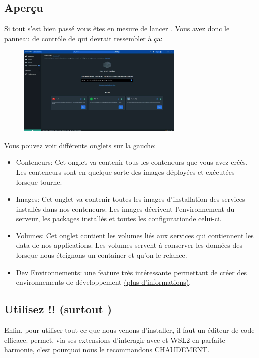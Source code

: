 \newpage

\subsection[Aperçu]{Aperçu\label{sec:suite_installation}}
    Si tout s'est bien passé vous êtes en mesure de lancer \dockerdesktop{}. Vous avez donc le panneau de contrôle de \dockerdesktop{} qui devrait ressembler à ça:\\
    \begin{figure}[h]
        \centering
        \includegraphics[width=0.7\textwidth]{Images_formation/PanelDocker.pdf}
    \end{figure}

    Vous pouvez voir différents onglets sur la gauche:

    \begin{itemize}
        \item Conteneurs: Cet onglet va contenir tous les conteneurs que vous avez créés. Les conteneurs sont en quelque sorte des images déployées et exécutées lorsque \docker{} tourne.
        \item Images: Cet onglet va contenir toutes les images d'installation des services installés dans nos conteneurs. Les images décrivent l'environnement du serveur, les packages installés et toutes les configurationde celui-ci.
        \item Volumes: Cet onglet contient les volumes liés aux services qui contiennent les data de nos applications. Les volumes servent à conserver les données des \db{} lorsque nous éteignons un container et qu'on le relance.
        \item Dev Environnements: une feature très intéressante permettant de créer des environnements de développement \footnotesize{\href{https://docs.docker.com/desktop/dev-environments/}{(plus d'informations)}}.
    \end{itemize}

\subsection[VS Code]{Utilisez \vscode!! (surtout \windows)}
    Enfin, pour utiliser tout ce que nous venons d'installer, il faut un éditeur de code efficace. \href{https://code.visualstudio.com/}{\vscode{}} permet, via ses extensions d'interagir avec \docker{} et WSL2 en parfaite harmonie, c'est pourquoi nous le recommandons CHAUDEMENT. 

